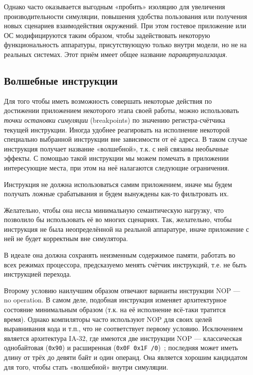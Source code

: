 Однако часто оказывается выгодным «пробить» изоляцию для увеличения производительности симуляции, повышения удобства пользования или получения новых сценариев взаимодействия окружений. При этом гостевое приложение или ОС модифицируются таким образом, чтобы задействовать некоторую функциональность аппаратуры, присутствующую только внутри модели, но не на реальных системах. Этот приём имеет общее название \textit{паравиртуализация}.

\subsection{Волшебные инструкции}

Для того чтобы иметь возможность совершать некоторые действия по достижении приложением некоторого этапа своей работы, можно использовать \textit{точки остановки симуляции} (\abbr breakpoints) по значению регистра-счётчика текущей инструкции. Иногда удобнее реагировать на исполнение некоторой специально выбранной инструкции вне зависимости от её адреса. В таком случае инструкция получает название «волшебной», т.к. с ней связаны необычные эффекты. С помощью такой инструкции мы можем помечать в приложении интересующие места, при этом на неё налагаются следующие ограничения.

\begin{itemize*}
\item    Инструкция не должна использоваться самим приложением, иначе мы будем получать ложные срабатывания и будем вынуждены как-то фильтровать их.
\item    Желательно, чтобы она несла минимальную семантическую нагрузку, что позволило бы использовать её во многих сценариях. Так, желательно, чтобы инструкция не была неопределённой на реальной аппаратуре, иначе приложение с ней не будет корректным вне симулятора. 
\item В идеале она должна сохранять неизменным содержимое памяти, работать во всех режимах процессора, предсказуемо менять счётчик инструкций, т.е. не быть инструкцией перехода. 
\end{itemize*}

Второму условию наилучшим образом отвечают варианты инструкции NOP — no operation. В самом деле, подобная инструкция изменяет архитектурное состояние минимальным образом (т.к. на её исполнение всё-таки тратится время). Однако компиляторы часто используют NOP для своих целей выравнивания кода и т.п., что не соответствует первому условию. Исключением является архитектура IA-32, где имеются две инструкции NOP — классическая однобайтовая (\texttt{0x90}) и  расширенная (\texttt{0x0F 0x1F /0})~\cite{intelmanual2a}; последняя может иметь длину от трёх до девяти байт и один операнд. Она является хорошим кандидатом для того, чтобы стать «волшебной» внутри симуляции.


